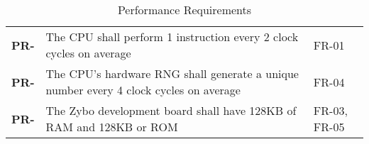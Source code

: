 \resetfyshcounter
\newcommand{\pr}[2]{
	\textbf{PR-\rc} & #1 & #2 \\
	\hline
}
\begin{table}[H]
	\begin{tabularx}{\textwidth}{| a | x | a |}
		\hline
		 &  &  \\
		\hline
		\pr{The CPU shall perform 1 instruction every 2 clock cycles on average}%
		{FR-01}

		\pr{The CPU's hardware RNG shall generate a unique number every 4 clock
			cycles on average}%
		{FR-04}

		\pr{The Zybo development board shall have 128KB of RAM and 128KB or ROM}%
		{FR-03, FR-05}
	\end{tabularx}
	\caption{Performance Requirements}
\end{table}

